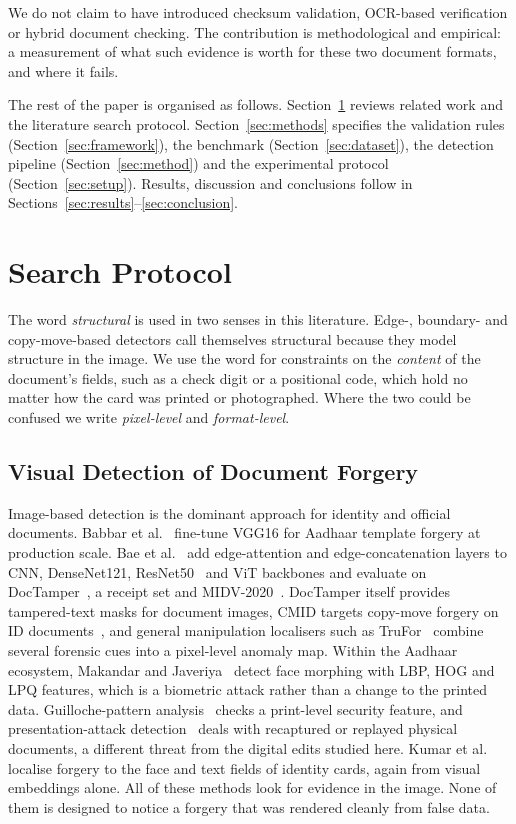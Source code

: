 \documentclass[12pt]{article}
\begin{document}
We do not claim to have introduced checksum validation, OCR-based
verification or hybrid document checking. The contribution is
methodological and empirical: a measurement of what such
evidence is worth for these two document formats, and where it fails.

The rest of the paper is organised as follows. Section~\ref{sec:related}
reviews related work and the literature search protocol. Section~\ref{sec:methods} specifies the
validation rules (Section~\ref{sec:framework}), the benchmark (Section~\ref{sec:dataset}),
the detection pipeline (Section~\ref{sec:method}) and
the experimental protocol (Section~\ref{sec:setup}). Results, discussion
and conclusions follow in Sections~\ref{sec:results}--\ref{sec:conclusion}.

\section{Search Protocol}
\label{sec:related}

The word \emph{structural} is used in two senses in this literature.
Edge-, boundary- and copy-move-based detectors call themselves
structural because they model structure in the image. We use the word
for constraints on the \emph{content} of the document's fields, such as
a check digit or a positional code, which hold no matter how the card
was printed or photographed. Where the two could be confused we write
\emph{pixel-level} and \emph{format-level}.

\subsection{Visual Detection of Document Forgery}

Image-based detection is the dominant approach for identity and
official documents. Babbar et al.~\cite{babbar} fine-tune VGG16 for
Aadhaar template forgery at production scale. Bae et
al.~\cite{bae} add edge-attention and edge-concatenation layers to CNN,
DenseNet121, ResNet50~\cite{resnet} and ViT backbones and evaluate on
DocTamper~\cite{doctamper}, a receipt set and MIDV-2020~\cite{midv}.
DocTamper itself provides tampered-text masks for document images, CMID
targets copy-move forgery on ID documents~\cite{cmid}, and general
manipulation localisers such as TruFor~\cite{trufor} combine several
forensic cues into a pixel-level anomaly map. Within the Aadhaar
ecosystem, Makandar and Javeriya~\cite{morph} detect face morphing with
LBP, HOG and LPQ features, which is a biometric attack rather than a
change to the printed data. Guilloche-pattern analysis~\cite{guilloche}
checks a print-level security feature, and presentation-attack
detection~\cite{pad} deals with recaptured or replayed physical
documents, a different threat from the digital edits studied here.
Kumar et al.~\cite{flid} localise forgery to the face and text fields
of identity cards, again from visual embeddings alone. All of these
methods look for evidence in the image. None of them is
designed to notice a forgery that was rendered cleanly from false data.
\end{document}
